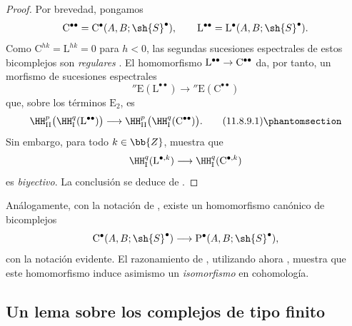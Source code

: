 \documentclass[oneside]{amsart}
\makeatletter
\newcommand{\ega@arrow}[2]{\mathchoice{#1}{#2}{#2}{#2}}
\renewcommand{\to}{\ega@arrow{\longrightarrow}{\rightarrow}}
\let\EGAOriginalLabel\label
\renewcommand{\label}[1]{\phantomsection\EGAOriginalLabel{#1}}
\makeatother
\begin{document}
\begin{proof}
Por brevedad, pongamos
\[
  \mathrm{C}^{\bullet\bullet}
  =
  \mathrm{C}^\bullet(A,B;\sh{S}^\bullet),
  \qquad
  \mathrm{L}^{\bullet\bullet}
  =
  \mathrm{L}^\bullet(A,B;\sh{S}^\bullet).
\]
Como $\mathrm{C}^{hk}=\mathrm{L}^{hk}=0$ para $h<0$, las segundas
sucesiones espectrales de estos bicomplejos son \emph{regulares}
.
El homomorfismo
$\mathrm{L}^{\bullet\bullet}\to\mathrm{C}^{\bullet\bullet}$ da, por tanto,
un morfismo de sucesiones espectrales
\[
  {}''\mathrm{E}(\mathrm{L}^{\bullet\bullet})
  \longrightarrow
  {}''\mathrm{E}(\mathrm{C}^{\bullet\bullet})
\]
que, sobre los términos $\mathrm{E}_2$, es
\[
  \HH^p_{\mathrm{II}}
  \bigl(\HH^q_{\mathrm{I}}(\mathrm{L}^{\bullet\bullet})\bigr)
  \longrightarrow
  \HH^p_{\mathrm{II}}
  \bigl(\HH^q_{\mathrm{I}}(\mathrm{C}^{\bullet\bullet})\bigr).
  \tag{11.8.9.1}\label{0.11.8.9.1}
\]
Sin embargo, para todo $k\in\bb{Z}$,  muestra que
\[
  \HH^q_{\mathrm{I}}(\mathrm{L}^{\bullet,k})
  \longrightarrow
  \HH^q_{\mathrm{I}}(\mathrm{C}^{\bullet,k})
\]
es \emph{biyectivo}.
La conclusión se deduce de .
\end{proof}

\begin{env}[11.8.10]
\label{0.11.8.10}
Análogamente, con la notación de , existe un
homomorfismo canónico de bicomplejos
\[
  \mathrm{C}^\bullet(A,B;\sh{S}^\bullet)
  \longrightarrow
  \mathrm{P}^\bullet(A,B;\sh{S}^\bullet),
\]
con la notación evidente.
El razonamiento de , utilizando ahora , muestra que
este homomorfismo induce asimismo un \emph{isomorfismo} en cohomología.
\end{env}

\subsection{Un lema sobre los complejos de tipo finito}
\label{subsection:0.11.9}
\end{document}
